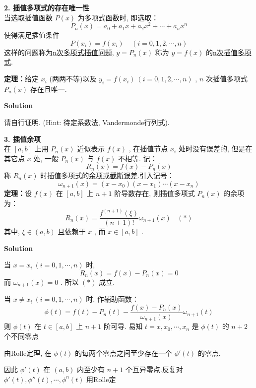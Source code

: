 \documentclass[11pt,a4paper,openany,oneside]{book}
\newcommand\Solution{\noindent\textbf{\textsf{Solution}}\par\medskip}
\begin{document}
\textbf{2. 插值多项式的存在唯一性}  \\
当选取插值函数 $ P(x) $ 为多项式函数时, 即选取：
 $$  P_n(x) = a_0 + a_1x + a_2x^2 + \cdots + a_nx^n  $$ 
使得满足插值条件
 $$  P(x_i) = f(x_i) \ \ \ \ \ (i = 0, 1, 2, \cdots, n)  $$ 
这样的问题称为\underline{n次多项式插值问题},  $ y = P_n(x) $ 称为 $ y=f(x) $ 的\underline{n次插值多项式}. \\

\begin{myexample}
	\textbf{定理：}给定 $ x_i $ (两两不等)以及 $ y_i = f(x_i)\ (i = 0, 1, 2, \cdots, n) $ ,  $ n $ 次插值多项式 $ P_n(x) $ 存在且唯一. 
	
\end{myexample}
\Solution
请自行证明. (Hint: 待定系数法, Vandermonde行列式). \\

\begin{myexample}
	\textbf{3. 插值余项} \\ 
	在 $ [a,b] $ 上用 $ P_n(x) $ 近似表示 $ f(x) $ , 在插值节点 $ x_i $ 处时没有误差的, 但是在其它点 $ x $ 处, 一般 $ P_n(x) $ 与 $ f(x) $ 不相等. 记：
	 $$  R_n(x) = f(x) - P_n(x)  $$ 
	称 $ R_n(x) $ 时插值多项式的\underline{余项}或\underline{截断误差}.引入记号：
	 $$  \omega_{n+1}(x) = (x-x_0)(x-x_1)\cdots(x-x_n)  $$ 
	\textbf{定理：}设 $ f(x) $ 在 $ [a,b] $ 上 $ n+1 $ 阶导数存在, 则插值多项式 $ P_n(x) $ 的余项为：
	 $$  R_n(x) = \dfrac{f^{(n+1)}(\xi)}{(n+1)!}\omega_{n+1}(x) \ \ \ \ (*)  $$ 
	\hspace{2.3em} 其中,  $ \xi \in (a,b) $ 且依赖于 $ x $ , 而 $ x \in [a,b] $ . \\
	
\end{myexample}
\Solution 当 $ x = x_i\ (i = 0, 1, \cdots, n) $ 时, 
 $$  R_n(x) = f(x) - P_n(x) = 0  $$ 
\hspace{2.7em} 而 $ \omega_{n+1}(x) = 0 $ . 所以 $ (*) $ 成立. 

\hspace{2.7em} 当 $ x \neq x_i\ (i=0, 1, \cdots, n) $ 时, 作辅助函数：
 $$  \phi(t) = f(t) - P_n(t) - \dfrac{f(x) - P_n(x)}{\omega_{n+1}(x)}\omega_{n+1}(t)  $$  
\hspace{2.7em} 则 $ \phi(t) $ 在 $ t \in [a,b] $ 上 $ n+1 $ 阶可导. 易知 $ t = x, x_0,\cdots, x_n $ 是 $ \phi(t) $ 的 $ n+2 $ 个不同零点

\hspace{2.7em} 由Rolle定理, 在 $ \phi(t) $ 的每两个零点之间至少存在一个 $ \phi'(t) $ 的零点. 

\hspace{2.7em} 因此 $ \phi'(t) $ 在 $ (a,b) $ 内至少有 $ n+1 $ 个互异零点.反复对 $ \phi'(t), \phi''(t), \cdots, \phi^{n}(t) $ 用Rolle定
\end{document}
